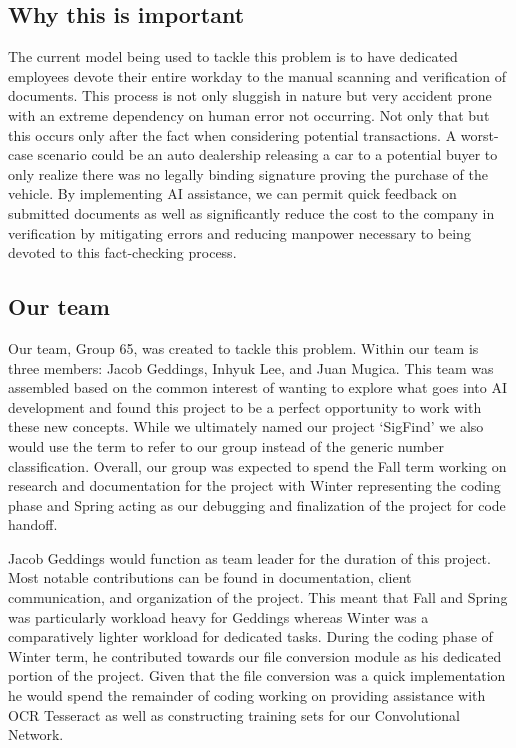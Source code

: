 \documentclass[article, onecolumn, draftclsnofoot,10pt, compsoc]{IEEEtran}
\begin{document}
\subsection{Why this is important}
The current model being used to tackle this problem is to have dedicated employees devote their entire workday to the manual scanning and verification of documents. This process is not only sluggish in nature but very accident prone with an extreme dependency on human error not occurring. Not only that but this occurs only after the fact when considering potential transactions. A worst-case scenario could be an auto dealership releasing a car to a potential buyer to only realize there was no legally binding signature proving the purchase of the vehicle. By implementing AI assistance, we can permit quick feedback on submitted documents as well as significantly reduce the cost to the company in verification by mitigating errors and reducing manpower necessary to being devoted to this fact-checking process.

\subsection{Our team}
Our team, Group 65, was created to tackle this problem. Within our team is three members: Jacob Geddings, Inhyuk Lee, and Juan Mugica. This team was assembled based on the common interest of wanting to explore what goes into AI development and found this project to be a perfect opportunity to work with these new concepts. While we ultimately named our project ‘SigFind’ we also would use the term to refer to our group instead of the generic number classification. Overall, our group was expected to spend the Fall term working on research and documentation for the project with Winter representing the coding phase and Spring acting as our debugging and finalization of the project for code handoff.

Jacob Geddings would function as team leader for the duration of this project. Most notable contributions can be found in documentation, client communication, and organization of the project. This meant that Fall and Spring was particularly workload heavy for Geddings whereas Winter was a comparatively lighter workload for dedicated tasks. During the coding phase of Winter term, he contributed towards our file conversion module as his dedicated portion of the project. Given that the file conversion was a quick implementation he would spend the remainder of coding working on providing assistance with OCR Tesseract as well as constructing training sets for our Convolutional Network. 
\end{document}

